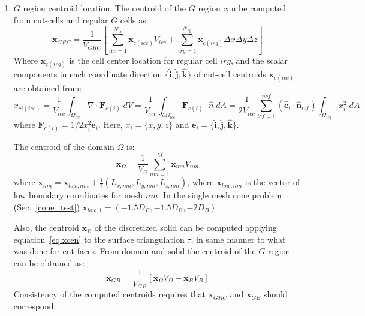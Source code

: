 \documentclass[11pt]{book}
\begin{document}
\begin{enumerate}
    \item $G$ region centroid location:
    The centroid of the $G$ region can be computed from cut-cells and regular $G$ cells as:
    \begin{equation}
       \mathbf{x}_{GRC} = \frac{1}{V_{GRC}}
       \left[  \sum_{icc=1}^{N_{cc}}{\mathbf{x}_{c(icc)}V_{icc}} +  \sum_{irg=1}^{N_{rg}}{\mathbf{x}_{c(irg)} \Delta x \Delta y \Delta z} \right]
    \end{equation}
    Where $\mathbf{x}_{c(irg)}$ is the cell center location for regular cell $irg$, and the scalar components in each coordinate direction  $\{\mathbf{\hat{i}},\mathbf{\hat{j}},\mathbf{\hat{k}}\}$ of cut-cell centroids $\mathbf{x}_{c(icc)}$ are obtained from:
    \begin{equation}
    x_{ci(icc)} = \frac{1}{V_{icc}} \int_{\Omega _{icc}} \nabla \cdot \mathbf{F}_{c(i)} \; dV =
    \frac{1}{V_{icc}} \int_{\partial \Omega _{icc}} \mathbf{F}_{c(i)} \cdot \hat{n} \; dA =
  \frac{1}{2V_{icc}} \sum_{icf=1}^{ncf} (\mathbf{\hat{e}}_i \cdot \mathbf{\hat{n}}_{icf}) \int_{\Omega _{icf}} x_i^2 \; dA
    \label{eq:xcen}
    \end{equation}
    where $\mathbf{F}_{c(i)}=1/2 x_i^2 \mathbf{\hat{e}}_i$. Here, $x_i=\{x,y,z\}$ and $\mathbf{\hat{e}}_i=\{\mathbf{\hat{i}},\mathbf{\hat{j}},\mathbf{\hat{k}}\}$.

    The centroid of the domain $\Omega$ is:
    \begin{equation}
        \mathbf{x}_\Omega = \frac{1}{V_\Omega} \sum_{nm=1}^M  \mathbf{x}_{nm} V_{nm}
    \end{equation}
    where $\mathbf{x}_{nm}=\mathbf{x}_{low,nm}+\frac{1}{2} \left( L_{x,nm},L_{y,nm},L_{z,nm} \right)$, where $\mathbf{x}_{low,nm}$ is the vector of low boundary coordinates for mesh $nm$. In the single mesh cone problem (Sec.~\ref{cone_test}) $\mathbf{x}_{low,1}= \left( -1.5D_B,-1.5D_B,-2D_B \right)$.

    Also, the centroid $\mathbf{x}_B$ of the discretized solid can be computed applying equation~\eqref{eq:xcen} to the surface triangulation $\tau$, in same manner to what was done for cut-faces. From domain and solid the centroid of the $G$ region can be obtained as:
    \begin{equation}
      \mathbf{x}_{GB}=\frac{1}{V_{GB}} \left[ \mathbf{x}_\Omega V_\Omega - \mathbf{x}_B V_B \right]
    \end{equation}
    Consistency of the computed centroids requires that $\mathbf{x}_{GRC}$ and $\mathbf{x}_{GB}$ should correspond.

\end{enumerate}

\fi
\end{document}
